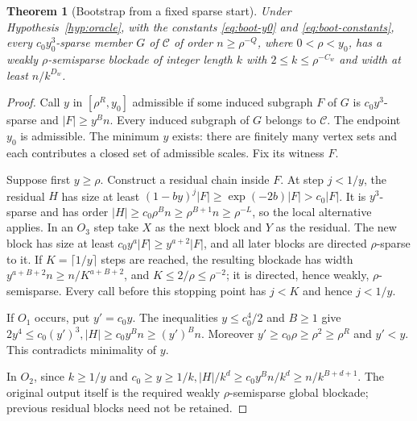 \documentclass[11pt,a4paper]{article}
\newtheorem{theorem}{Theorem}[section]
\theoremstyle{definition}
\theoremstyle{remark}
\numberwithin{equation}{section}
\begin{document}
\begin{theorem}[Bootstrap from a fixed sparse start]\label{thm:bootstrap}
Under Hypothesis~\ref{hyp:oracle}, with the constants \eqref{eq:boot-y0} and \eqref{eq:boot-constants}, every \(c_{0} y_{0}^{3}\)-sparse member \(G\) of \(\mathcal C\) of order \(n\ge \rho^{-Q}\), where \(0<\rho<y_{0}\), has a weakly \(\rho\)-semisparse blockade of integer length \(k\) with \(2\le k\le \rho^{-C_{w}}\) and width at least \(n/k^{D_{w}}\).
\end{theorem}
\begin{proof}
Call \(y\) in \([\rho^{R},\allowbreak y_{0}]\) admissible if some induced subgraph \(F\) of \(G\) is \(c_{0} y^{3}\)-sparse and \(|F|\ge\allowbreak y^{B} n\). Every induced subgraph of \(G\) belongs to \(\mathcal C\). The endpoint \(y_{0}\) is admissible. The minimum \(y\) exists: there are finitely many vertex sets and each contributes a closed set of admissible scales. Fix its witness \(F\).

Suppose first \(y\ge\allowbreak \rho\). Construct a residual chain inside \(F\). At step \(j<1/y\), the residual \(H\) has size at least \((1-by)^{j}|F|\ge\allowbreak \exp (-2b)|F|>c_{0}|F|\). It is \(y^{3}\)-sparse and has order \(|H|\ge\allowbreak c_{0} \rho^{B} n\ge\allowbreak \rho^{B+1}n\ge\allowbreak \rho^{-L}\), so the local alternative applies. In an \(O_{3}\) step take \(X\) as the next block and \(Y\) as the residual. The new block has size at least \(c_{0} y^{a}|F|\ge\allowbreak y^{a+2}|F|\), and all later blocks are directed \(\rho\)-sparse to it. If \(K=\lceil 1/y\rceil\) steps are reached, the resulting blockade has width \(y^{a+B+2}n\ge\allowbreak n/K^{a+B+2}\), and \(K\le\allowbreak 2/\rho\le\allowbreak \rho^{-2}\); it is directed, hence weakly, \(\rho\)-semisparse. Every call before this stopping point has \(j<K\) and hence \(j<1/y\).

If \(O_{1}\) occurs, put \(y'=c_{0} y\). The inequalities \(y\le\allowbreak c_{0}^{4}/2\) and \(B\ge\allowbreak 1\) give \(2y^{4}\le\allowbreak c_{0}(y')^{3},\allowbreak  |H|\ge\allowbreak c_{0} y^{B} n\ge\allowbreak (y')^{B} n\). Moreover \(y'\ge\allowbreak c_{0} \rho\ge\allowbreak \rho^{2}\ge\allowbreak \rho^{R}\) and \(y'<y\). This contradicts minimality of \(y\).

In \(O_{2}\), since \(k\ge\allowbreak 1/y\) and \(c_{0}\ge\allowbreak y\ge\allowbreak 1/k,\allowbreak  |H|/k^{d}\ge\allowbreak c_{0} y^{B} n/k^{d}\ge\allowbreak n/k^{B+d+1}\). The original output itself is the required weakly \(\rho\)-semisparse global blockade; previous residual blocks need not be retained.


\end{proof}
\end{document}
